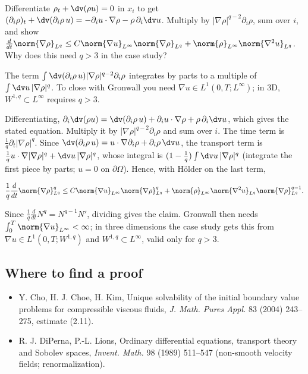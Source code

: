 \begin{exercise}
  Differentiate $\rho_t + \dv(\rho u) = 0$ in $x_i$ to get $(\partial_i\rho)_t + \dv(\partial_i\rho\,u) = -\partial_i u\cdot\nabla\rho - \rho\,\partial_i\dv u$. Multiply by $|\nabla\rho|^{q-2}\partial_i\rho$, sum over $i$, and show $\frac{d}{dt}\norm{\nabla\rho}_{L^q} \le C\norm{\nabla u}_{L^\infty}\norm{\nabla\rho}_{L^q} + \norm{\rho}_{L^\infty}\norm{\nabla^2u}_{L^q}$. Why does this need $q > 3$ in the case study?
  \begin{hint}
    The term $\int\dv(\partial_i\rho\,u)|\nabla\rho|^{q-2}\partial_i\rho$ integrates by parts to a multiple of $\int\dv u\,|\nabla\rho|^q$. To close with Gronwall you need $\nabla u \in L^1(0,T;L^\infty)$; in 3D, $W^{1,q} \subset L^\infty$ requires $q > 3$.
  \end{hint}
  \begin{solution}
    Differentiating, $\partial_i\dv(\rho u) = \dv(\partial_i\rho\,u) + \partial_iu\cdot\nabla\rho + \rho\,\partial_i\dv u$, which gives the stated equation. Multiply it by $|\nabla\rho|^{q-2}\partial_i\rho$ and sum over $i$. The time term is $\frac1q\partial_t|\nabla\rho|^q$. Since $\dv(\partial_i\rho\,u) = u\cdot\nabla\partial_i\rho + \partial_i\rho\,\dv u$, the transport term is $\frac1qu\cdot\nabla|\nabla\rho|^q + \dv u\,|\nabla\rho|^q$, whose integral is $(1 - \frac1q)\int\dv u\,|\nabla\rho|^q$ (integrate the first piece by parts; $u = 0$ on $\partial\Omega$). Hence, with Hölder on the last term,

    \[ \frac1q\frac{d}{dt}\norm{\nabla\rho}_{L^q}^q \le C\norm{\nabla u}_{L^\infty}\norm{\nabla\rho}_{L^q}^q
             + \norm{\rho}_{L^\infty}\norm{\nabla^2u}_{L^q}\norm{\nabla\rho}_{L^q}^{q-1}. \]

    Since $\frac1q\frac{d}{dt}N^q = N^{q-1}N'$, dividing gives the claim. Gronwall then needs $\int_0^T\norm{\nabla u}_{L^\infty} < \infty$; in three dimensions the case study gets this from $\nabla u \in L^1(0,T;W^{1,q})$ and $W^{1,q} \subset L^\infty$, valid only for $q > 3$.
  \end{solution}
\end{exercise}

\subsection*{Where to find a proof}

\begin{itemize}
\item Y. Cho, H. J. Choe, H. Kim, Unique solvability of the initial boundary value problems for compressible viscous fluids, \emph{J. Math. Pures Appl.} 83 (2004) 243--275, estimate (2.11).
\item R. J. DiPerna, P.-L. Lions, Ordinary differential equations, transport theory and Sobolev spaces, \emph{Invent. Math.} 98 (1989) 511--547 (non-smooth velocity fields; renormalization).
\end{itemize}


